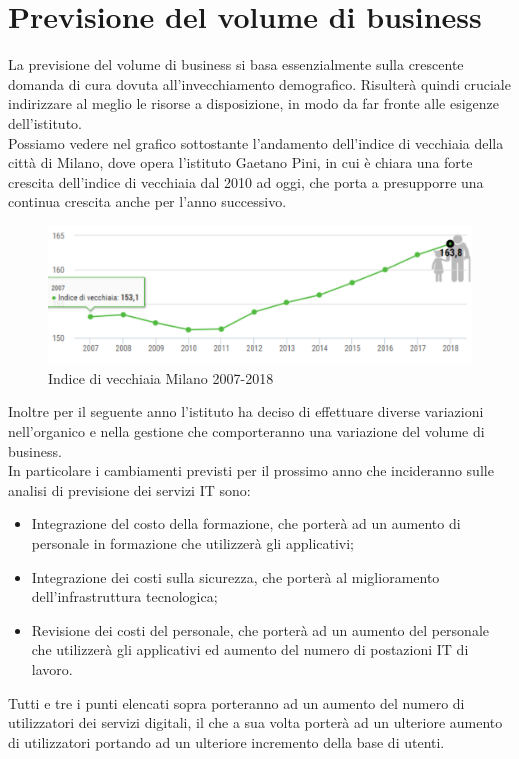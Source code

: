 \newpage
\section{Previsione del volume di business} \label{ref:previsione}
La previsione del volume di business si basa essenzialmente sulla crescente domanda di cura dovuta all’invecchiamento demografico. Risulterà quindi cruciale indirizzare al meglio le risorse a disposizione, in modo da far fronte alle esigenze dell'istituto.\\
Possiamo vedere nel grafico sottostante l'andamento dell'indice di vecchiaia della città di Milano, dove opera l'istituto Gaetano Pini, in cui è chiara una forte crescita dell'indice di vecchiaia dal 2010 ad oggi, che porta a presupporre una continua crescita anche per l'anno successivo.
\begin{figure}[h!]
	\centering
	\includegraphics[width=\linewidth]{./img/vecchiaia.jpg}
	\caption{Indice di vecchiaia Milano 2007-2018}\label{fig:vecchiaia}
\end{figure}

Inoltre per il seguente anno l'istituto ha deciso di effettuare diverse variazioni nell'organico e nella gestione che comporteranno una variazione del volume di business. \\
In particolare i cambiamenti previsti per il prossimo anno che incideranno sulle analisi di previsione dei servizi IT sono:
\begin{itemize}
	\item Integrazione del costo della formazione, che porterà ad un aumento di personale in formazione che utilizzerà gli applicativi;
	\item Integrazione dei costi sulla sicurezza, che porterà al miglioramento dell'infrastruttura tecnologica;
	\item Revisione dei costi del personale, che porterà ad un aumento del personale che utilizzerà gli applicativi ed aumento del numero di postazioni IT di lavoro.
\end{itemize}

Tutti e tre i punti elencati sopra porteranno ad un aumento del numero di utilizzatori dei servizi digitali, il che a sua volta porterà ad un ulteriore aumento di utilizzatori portando ad un ulteriore incremento della base di utenti.